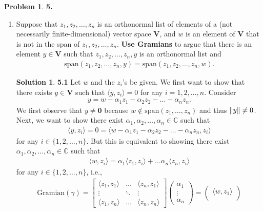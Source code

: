 \documentclass{article}
\theoremstyle{definition}
\newtheorem*{prob*}{Problem}
\newtheorem*{sln*}{Solution}
\newcommand{\V}{\mathbf{V}}
\newcommand{\xpan}{\text{span}}
\newcommand{\la}{\langle}
\newcommand{\ra}{\rangle}
\begin{document}
\begin{prob*}\textbf{5.}
	\begin{enumerate}
		\item Suppose that $z_1, z_2, \dots, z_n$ is an orthonormal list of elements of a (not necessarily finite-dimensional) vector space $\V$, and $w$ is an element of $\V$ that is not in the span of $z_1,z_2,\dots,z_n$. \textbf{Use Gramians} to argue that there is an element $y\in \V$ such that $z_1, z_2,\dots,z_n, y$ is an orthonormal list and
		\begin{align*}
		\xpan(z_1,z_2,\dots,z_n,y) = \xpan(z_1,z_2,\dots,z_n,w).
		\end{align*}
		
		
		\begin{sln*}\textbf{5.1}
			Let $w$ and the $z_i$'s be given. We first want to show that there exists $y\in \V$ such that $\la y,z_i\ra = 0$ for any $i=1,2,\dots,n$. Consider
			\begin{align*}
			y = w - \alpha_1 z_1 - \alpha_2 z_2 - \dots - \alpha_n z_n.
			\end{align*}
			We first observe that $y \neq \mathbf{0}$ because $w \notin \xpan(z_1,\dots,z_n)$ and thus $\norm{y} \neq 0$. Next, we want to show there exist $\alpha_1,\alpha_2,\dots,\alpha_n \in \mathbb{C}$ such that
			\begin{align*}
			\la y ,z_i \ra = 0 = \la w - \alpha_1 z_1 - \alpha_2 z_2 - \dots - \alpha_n z_n, z_i \ra
			\end{align*}
			for any $i \in \{1,2,\dots,n\}$. But this is equivalent to showing there exist $\alpha_1,\alpha_2,\dots,\alpha_n \in \mathbb{C}$ such that
			\begin{align*}
			\la w ,z_i \ra = \alpha_1\la z_1,z_i \ra + \dots \alpha_n\la z_n,z_i \ra
			\end{align*}
			for any $i \in \{1,2,\dots,n \}$, i.e., 
			\begin{align*}
			\text{Gramian}(\gamma) = 
			\begin{bmatrix}
			\la z_1 , z_1 \ra & \dots & \la z_n,z_1 \ra\\
			\vdots & \ddots&\vdots\\
			\la z_1, z_n \ra & \dots & \la z_n,z_n \ra
			\end{bmatrix}\begin{pmatrix}
			\alpha_1 \\ \vdots \\ \alpha_n
			\end{pmatrix} = \begin{pmatrix}
			\la w,z_1 \ra\\

\end{pmatrix}
\end{align*}
\end{sln*}
\end{enumerate}
\end{prob*}
\end{document}
